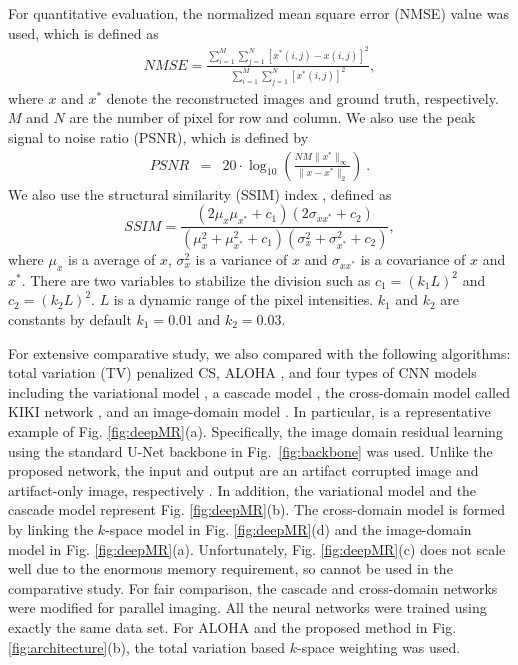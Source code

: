 \documentclass[10pt,journal]{IEEEtran}
\newcommand{\0}{{\boldsymbol{0}}}
\begin{document}
For quantitative evaluation, the normalized mean square error (NMSE) value was used, which is defined as
\begin{eqnarray}
	NMSE = \frac{\sum_{i=1}^{M} \sum_{j=1}^{N} [x^*(i,j) - {x}(i, j)]^2}{\sum_{i=1}^{M}\sum_{j=1}^{N}[x^*(i,j)]^2},
\end{eqnarray}
where $x$ and $x^*$ denote the reconstructed images and ground truth, respectively. $M$ and $N$ are the number of pixel for row and column.
We also use the peak signal to noise ratio (PSNR), which is defined by
\begin{eqnarray}
	PSNR &=& 20 \cdot \log_{10} \left(\frac{NM\|x^*\|_\infty}{\| x- x^*\|_2}\right) \  .
\label{eq:psnr}		 
\end{eqnarray}
We also use the structural similarity (SSIM) index  \cite{wang2004image}, defined as
\begin{equation}
	SSIM = \dfrac{(2\mu_{x}\mu_{x^*}+c_1)(2\sigma_{x x^*}+c_2)}{(\mu_{x}^2+\mu_{x^*}^2+c_1)(\sigma_{x}^2+\sigma_{x^*}^2+c_2)},
\end{equation}
where $\mu_{x}$ is a average of $x$, $\sigma_{x}^2$ is a variance of $x$ and $\sigma_{x x^*}$ is a covariance of $x$ and $x^*$. 
There are two variables to stabilize the division such as $c_1=(k_1L)^2$ and $c_2=(k_2L)^2$.
$L$ is a dynamic range of the pixel intensities. $k_1$ and $k_2$ are constants by default $k_1=0.01$ and $k_2=0.03$. 

For extensive comparative study, we also compared with the following algorithms:
 total variation (TV) penalized CS,  ALOHA \cite{jin2016general}, and four types of CNN models including the
 variational model \cite{hammernik2018learning}, a cascade model \cite{schlemper2018deep}, the cross-domain model called KIKI network  \cite{eo2018kiki}, and an image-domain model \cite{han2017deep}. In particular,  \cite{han2017deep}  is a representative
 example of  Fig. \ref{fig:deepMR}(a).
Specifically,  the image domain residual learning using the standard U-Net backbone in Fig.~\ref{fig:backbone} was used. 
Unlike the proposed network, the input and output are an artifact corrupted image and artifact-only image, respectively \cite{jin2017deep}.
In addition,  the variational model \cite{hammernik2018learning} and the cascade model \cite{schlemper2018deep}  represent Fig. \ref{fig:deepMR}(b). The cross-domain model is formed by linking the $k$-space model in Fig. \ref{fig:deepMR}(d) and the image-domain model in Fig. \ref{fig:deepMR}(a).  Unfortunately, Fig. \ref{fig:deepMR}(c) does not scale well due to the enormous memory requirement, so cannot be used in the comparative study. 
 For fair comparison, the cascade \cite{schlemper2018deep} and cross-domain \cite{eo2018kiki} networks were modified for
 parallel imaging.   All the neural networks were trained using exactly the same data set.
 For  ALOHA \cite{jin2016general} and the proposed method in Fig. \ref{fig:architecture}(b),
 the  total variation based $k$-space weighting was used.
\end{document}
